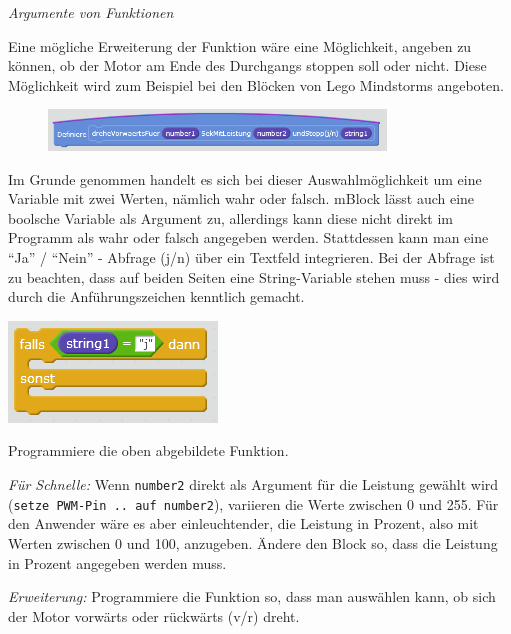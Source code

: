 \begin{aufgabe}\emph{Argumente von Funktionen}
	
	Eine mögliche Erweiterung der Funktion wäre eine Möglichkeit, angeben zu können, ob der Motor am Ende des Durchgangs stoppen soll oder nicht. Diese Möglichkeit wird zum Beispiel bei den Blöcken von Lego Mindstorms angeboten.
	
	\begin{figure}[H]
		\centering
		\includegraphics[width=0.8\textwidth]{./pics/komplexe-funktion.png}
	\end{figure}
	
	\medskip
	\begin{minipage}{0.7\textwidth}
		Im Grunde genommen handelt es sich bei dieser Auswahlmöglichkeit um eine Variable mit zwei Werten, nämlich wahr oder falsch. mBlock lässt auch eine boolsche Variable als Argument zu, allerdings kann diese nicht direkt im Programm als wahr oder falsch angegeben werden. Stattdessen kann man eine \enquote{Ja} / \enquote{Nein} - Abfrage (j/n) über ein Textfeld integrieren. Bei der Abfrage ist zu beachten, dass auf beiden Seiten eine String-Variable stehen muss - dies wird durch die Anführungszeichen kenntlich gemacht.
	\end{minipage}
	\hfill
	\begin{minipage}{0.28\textwidth}
		\centering
		\includegraphics[width=\textwidth]{./pics/komplexe-funktion-hinweis.png}
	\end{minipage}
	
	\vspace{\baselineskip}
	Programmiere die oben abgebildete Funktion.
	
	\medskip
	\emph{Für Schnelle:} Wenn \texttt{number2} direkt als Argument für die Leistung gewählt wird (\texttt{setze PWM-Pin .. auf number2}), variieren die Werte zwischen 0 und 255. Für den Anwender wäre es aber einleuchtender, die Leistung in Prozent, also mit Werten zwischen 0 und 100, anzugeben. Ändere den Block so, dass die Leistung in Prozent angegeben werden muss.
	
	\medskip
	\emph{Erweiterung:} Programmiere die Funktion so, dass man auswählen kann, ob sich der Motor vorwärts oder rückwärts (v/r) dreht.
\end{aufgabe}

